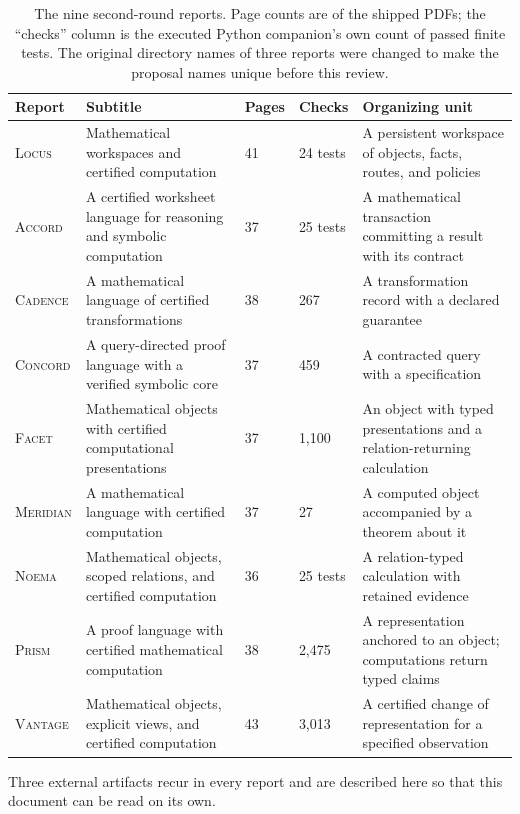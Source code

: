 \documentclass[11pt,a4paper]{article}
\newcommand{\Lc}{\textsc{Locus}}
\newcommand{\Ac}{\textsc{Accord}}
\newcommand{\Cd}{\textsc{Cadence}}
\newcommand{\Cc}{\textsc{Concord}}
\newcommand{\Fc}{\textsc{Facet}}
\newcommand{\Md}{\textsc{Meridian}}
\newcommand{\Nm}{\textsc{Noema}}
\newcommand{\Pm}{\textsc{Prism}}
\newcommand{\Vt}{\textsc{Vantage}}
\theoremstyle{definition}
\begin{document}
\begin{table}[htbp]
\centering\small
\caption{The nine second-round reports. Page counts are of the shipped PDFs; the ``checks'' column is the executed Python companion's own count of passed finite tests. The original directory names of three reports were changed to make the proposal names unique before this review.}
\label{tab:material}
\begin{tabularx}{\textwidth}{@{}L{18mm}L{47mm}L{12mm}L{13mm}Y@{}}
\toprule
Report & Subtitle & Pages & Checks & Organizing unit\\
\midrule
\Lc{} & Mathematical workspaces and certified computation & 41 & 24 tests & A persistent workspace of objects, facts, routes, and policies\\
\Ac{} & A certified worksheet language for reasoning and symbolic computation & 37 & 25 tests & A mathematical transaction committing a result with its contract\\
\Cd{} & A mathematical language of certified transformations & 38 & 267 & A transformation record with a declared guarantee\\
\Cc{} & A query-directed proof language with a verified symbolic core & 37 & 459 & A contracted query with a specification\\
\Fc{} & Mathematical objects with certified computational presentations & 37 & 1,100 & An object with typed presentations and a relation-returning calculation\\
\Md{} & A mathematical language with certified computation & 37 & 27 & A computed object accompanied by a theorem about it\\
\Nm{} & Mathematical objects, scoped relations, and certified computation & 36 & 25 tests & A relation-typed calculation with retained evidence\\
\Pm{} & A proof language with certified mathematical computation & 38 & 2,475 & A representation anchored to an object; computations return typed claims\\
\Vt{} & Mathematical objects, explicit views, and certified computation & 43 & 3,013 & A certified change of representation for a specified observation\\
\bottomrule
\end{tabularx}
\end{table}

Three external artifacts recur in every report and are described here so that this document can be read on its own.
\end{document}
